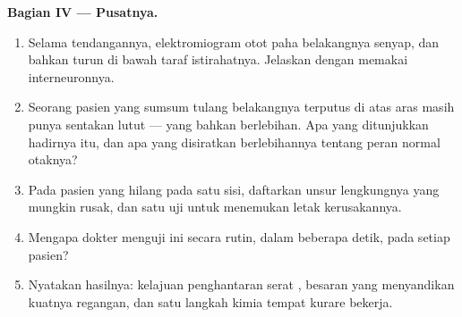 \begin{problem}
\medskip
\noindent\textbf{Bagian IV --- Pusatnya.}
\begin{enumerate}[resume]
  \item Selama tendangannya, elektromiogram otot paha belakangnya
        senyap, dan bahkan turun di bawah taraf istirahatnya. Jelaskan
        dengan memakai interneuronnya.
  \item Seorang pasien yang sumsum tulang belakangnya terputus di atas
        aras  masih punya sentakan lutut --- yang bahkan
        berlebihan. Apa yang ditunjukkan hadirnya  itu, dan apa
        yang disiratkan berlebihannya tentang peran normal otaknya?
  \item Pada pasien yang  hilang pada satu sisi, daftarkan
        unsur lengkungnya yang mungkin rusak, dan satu uji untuk
        menemukan letak kerusakannya.
  \item Mengapa dokter menguji  ini secara rutin, dalam beberapa
        detik, pada setiap pasien?
  \item Nyatakan hasilnya: kelajuan penghantaran serat ,
        besaran yang menyandikan kuatnya regangan, dan satu langkah
        kimia tempat kurare bekerja.
\end{enumerate}
\end{problem}
